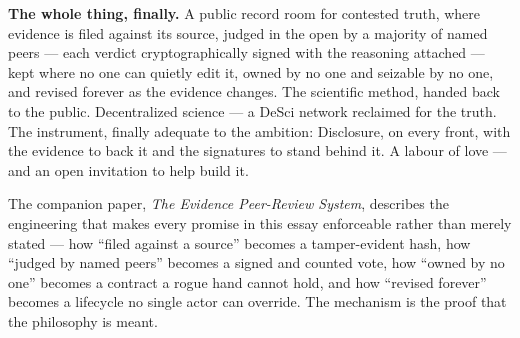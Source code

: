 \documentclass[11pt,a4paper]{article}
\begin{document}
\begin{notebox}
\textbf{The whole thing, finally.} A public record room for contested
truth, where evidence is filed against its source, judged in the open
by a majority of named peers --- each verdict cryptographically signed
with the reasoning attached --- kept where no one can quietly edit it,
owned by no one and seizable by no one, and revised forever as the
evidence changes. The scientific method, handed back to the public.
Decentralized science --- a DeSci network reclaimed for the truth. The
instrument, finally adequate to the ambition: Disclosure, on every
front, with the evidence to back it and the signatures to stand behind
it. A labour of love --- and an open invitation to help build it.
\end{notebox}

The companion paper, \emph{The Evidence Peer-Review System}, describes the
engineering that makes every promise in this essay enforceable rather than
merely stated --- how ``filed against a source'' becomes a tamper-evident
hash, how ``judged by named peers'' becomes a signed and counted vote, how
``owned by no one'' becomes a contract a rogue hand cannot hold, and how
``revised forever'' becomes a lifecycle no single actor can override. The
mechanism is the proof that the philosophy is meant.
\end{document}
